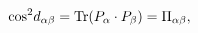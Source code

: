 \begin{equation}
{\rm cos}^{2}d_{\alpha\beta}={\rm Tr}(P_\alpha\cdot P_\beta)=\Pi_{\alpha\beta} ,
\label{eq:sekiz}      
\end{equation}


